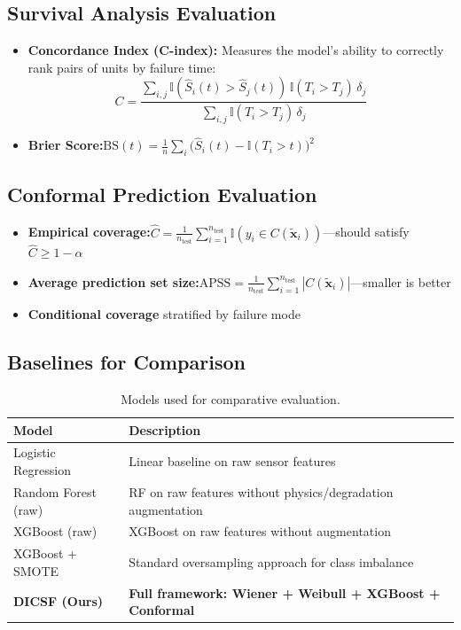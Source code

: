 \documentclass[12pt, a4paper]{article}
\begin{document}
\subsection{Survival Analysis Evaluation}

\begin{itemize}[leftmargin=*]
    \item \textbf{Concordance Index (C-index):} Measures the model's ability to correctly rank pairs of units by failure time:
    \begin{equation}
        C = \frac{\sum_{i,j}\mathbb{I}(\hat{S}_i(t) > \hat{S}_j(t))\,\mathbb{I}(T_i > T_j)\,\delta_j}{\sum_{i,j}\mathbb{I}(T_i > T_j)\,\delta_j}
    \end{equation}
    \item \textbf{Brier Score:}\quad $\mathrm{BS}(t) = \frac{1}{n}\sum_i\bigl(\hat{S}_i(t) - \mathbb{I}(T_i > t)\bigr)^2$
\end{itemize}

\subsection{Conformal Prediction Evaluation}

\begin{itemize}[leftmargin=*]
    \item \textbf{Empirical coverage:}\quad $\hat{C} = \frac{1}{n_{\mathrm{test}}}\sum_{i=1}^{n_{\mathrm{test}}}\mathbb{I}(y_i \in C(\tilde{\mathbf{x}}_i))$\quad---\quad should satisfy $\hat{C} \geq 1-\alpha$
    \item \textbf{Average prediction set size:}\quad $\mathrm{APSS} = \frac{1}{n_{\mathrm{test}}}\sum_{i=1}^{n_{\mathrm{test}}}|C(\tilde{\mathbf{x}}_i)|$\quad---\quad smaller is better
    \item \textbf{Conditional coverage} stratified by failure mode
\end{itemize}

\subsection{Baselines for Comparison}

\begin{table}[H]
    \centering
    \caption{Models used for comparative evaluation.}
    \label{tab:baselines}
    \begin{tabularx}{\textwidth}{l X}
        \toprule
        \textbf{Model} & \textbf{Description} \\
        \midrule
        Logistic Regression & Linear baseline on raw sensor features \\
        Random Forest (raw) & RF on raw features without physics/degradation augmentation \\
        XGBoost (raw) & XGBoost on raw features without augmentation \\
        XGBoost + SMOTE & Standard oversampling approach for class imbalance \\
        \textbf{DICSF (Ours)} & \textbf{Full framework: Wiener + Weibull + XGBoost + Conformal} \\
        \bottomrule
    \end{tabularx}
\end{table}
\end{document}
